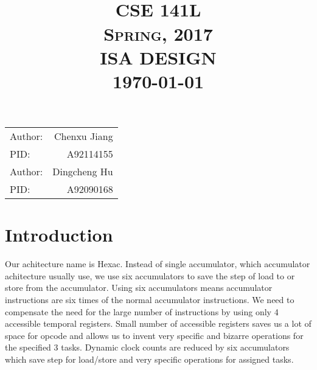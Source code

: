 \documentclass{article}
\title{\quad
  \\ [4.0cm]
  \normalsize \textsc{CSE 141L \\ Spring, 2017}
  \\ [2.0cm]
  \huge \textbf{\uppercase{ISA Design}}
  \\ [0.5cm]
  \normalsize \today}
\author{}
\date{}
\begin{document}
  \maketitle
  \vspace{6.0cm}
  \begin{large}
    \begin{center}
      \begin{tabular}{l r}
        Author:        & Chenxu Jiang \\
        PID:            & A92114155 \\
        Author:        & Dingcheng Hu \\
        PID:            & A92090168 
      \end{tabular}
    \end{center}
  \end{large}
  \newpage
  \section{Introduction}
    \qquad Our achitecture name is Hexac. Instead of single accumulator, which accumulator
    achitecture usually use, we use six accumulators to save the step of load to or
    store from the accumulator. Using six accumulators means accumulator instructions
    are six times of the normal accumulator instructions. We need to compensate the
    need for the large number of instructions by using only 4 accessible temporal
    registers. Small number of accessible registers saves us a lot of space for opcode
    and allows us to invent very specific and bizarre operations for the specified
    3 tasks. Dynamic clock counts are reduced by six accumulators which save step
    for load/store and very specific operations for assigned tasks.
\end{document}
